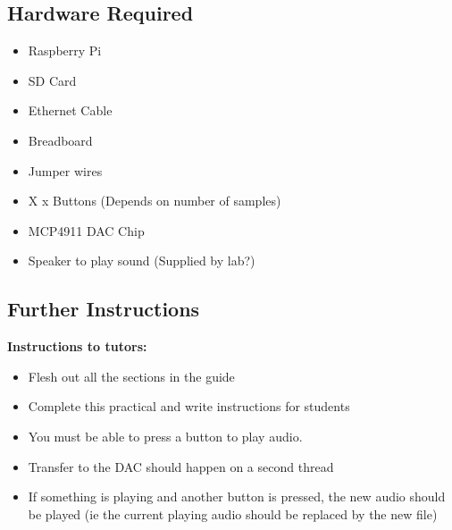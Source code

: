 \subsection{Hardware Required}
\begin{itemize}
    \item Raspberry Pi
    \item SD Card
    \item Ethernet Cable
    \item Breadboard
    \item Jumper wires
    \item X x Buttons (Depends on number of samples)
    \item MCP4911 DAC Chip
    \item Speaker to play sound (Supplied by lab?)
\end{itemize}


\subsection{Further Instructions}
\textbf{Instructions to tutors:}
\begin{itemize}
    \item Flesh out all the sections in the guide
    \item Complete this practical and write instructions for students
    \item You must be able to press a button to play audio. 
    \item Transfer to the DAC should happen on a second thread
    \item If something is playing and another button is pressed, the new audio should be played (ie the current playing audio should be replaced by the new file)
\end{itemize}